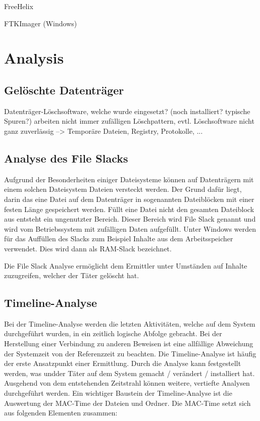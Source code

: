 FreeHelix

FTKImager (Windows)




\section{Analysis}

\subsection{Gelöschte Datenträger}
Datenträger-Löschsoftware, welche wurde eingesetzt? (noch installiert? typische Spuren?) arbeiten nicht immer zufälligen Löschpattern, evtl. Löschsoftware nicht ganz zuverlässig --> Temporäre Dateien, Registry, Protokolle, ...

\subsection{Analyse des File Slacks}
Aufgrund der Besonderheiten einiger Dateisysteme können auf Datenträgern mit einem solchen Dateisystem Dateien versteckt werden. Der Grund dafür liegt, darin das eine Datei auf dem Datenträger in sogenannten Dateiblöcken mit einer festen Länge gespeichert werden. Füllt eine Datei nicht den gesamten Dateiblock aus entsteht ein ungenutzter Bereich. Dieser Bereich wird File Slack genannt und wird vom Betriebssystem mit zufälligen Daten aufgefüllt. Unter Windows werden für das Auffüllen des Slacks zum Beispiel Inhalte aus dem Arbeitsspeicher verwendet. Dies wird dann als RAM-Slack bezeichnet.


Die File Slack Analyse ermöglicht dem Ermittler unter Umständen auf Inhalte zuzugreifen, welcher der Täter gelöscht hat.

\subsection{Timeline-Analyse}
Bei der Timeline-Analyse werden die letzten Aktivitäten, welche auf dem System durchgeführt wurden, in ein zeitlich logische Abfolge gebracht. Bei der Herstellung einer Verbindung zu anderen Beweisen ist eine allfällige Abweichung der Systemzeit von der Referenzzeit zu beachten. Die Timeline-Analyse ist häufig der erste Ansatzpunkt einer Ermittlung. Durch die Analyse kann festgestellt werden, was undder Täter auf dem System gemacht / verändert / installiert hat. Ausgehend von dem entstehenden Zeitstrahl können weitere, vertiefte Analysen durchgeführt werden. Ein wichtiger Baustein der Timeline-Analyse ist die Auswertung der MAC-Time der Dateien und Ordner. Die MAC-Time setzt sich aus folgenden Elementen zusammen:


